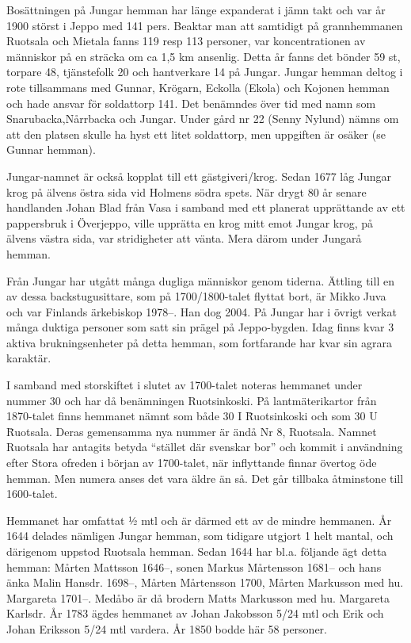 Bosättningen på Jungar hemman har länge expanderat i jämn takt och var år 1900 störst i Jeppo med 141 pers. Beaktar man att samtidigt på grannhemmanen Ruotsala och Mietala fanns 119 resp 113 personer, var koncentrationen av människor på en sträcka om ca 1,5 km ansenlig. Detta år fanns det bönder 59 st, torpare 48, tjänstefolk 20 och hantverkare 14 på Jungar. Jungar hemman deltog i rote tillsammans med Gunnar, Krögarn, Eckolla (Ekola) och Kojonen hemman och hade ansvar för soldattorp 141. Det benämndes över tid med namn som Snarubacka,Nårrbacka och Jungar. Under gård nr 22 (Senny Nylund) nämns om att den platsen skulle ha hyst ett litet soldattorp, men uppgiften är osäker (se Gunnar hemman).

Jungar-namnet är också kopplat till ett gästgiveri/krog. Sedan 1677 låg Jungar krog på älvens östra sida vid Holmens södra spets. När  drygt 80 år senare handlanden Johan Blad från Vasa i samband med ett planerat upprättande av ett pappersbruk i Överjeppo, ville upprätta en krog mitt emot Jungar krog,  på älvens västra sida, var stridigheter att vänta. Mera därom under Jungarå hemman.

Från Jungar har utgått många dugliga människor genom tiderna. Ättling till en av dessa backstugusittare, som på 1700/1800-talet flyttat bort, är Mikko Juva och var Finlands ärkebiskop 1978--. Han dog 2004. På Jungar har i övrigt verkat många duktiga personer som satt sin prägel på Jeppo-bygden. Idag finns kvar 3 aktiva brukningsenheter på detta hemman, som fortfarande har kvar sin agrara karaktär.



I samband med storskiftet i slutet av 1700-talet noteras hemmanet under nummer 30 och har då benämningen Ruotsinkoski. På lantmäterikartor från 1870-talet finns hemmanet nämnt som både 30 I \= Ruotsinkoski och som 30 U \= Ruotsala. Deras gemensamma nya nummer är ändå Nr 8, Ruotsala. Namnet Ruotsala har antagits betyda ``stället där svenskar bor'' och kommit i användning efter Stora ofreden i början av 1700-talet, när inflyttande finnar övertog öde hemman. Men numera anses det vara äldre än så. Det går tillbaka åtminstone till 1600-talet.

Hemmanet har omfattat ½ mtl och är därmed ett av de mindre hemmanen. År 1644 delades nämligen Jungar hemman, som tidigare utgjort 1 helt mantal, och därigenom uppstod Ruotsala hemman. Sedan 1644 har bl.a. följande ägt detta hemman:
Mårten Mattsson 1646--, sonen Markus Mårtensson 1681-- och hans änka Malin Hansdr. 1698--, Mårten Mårtensson  1700, Mårten Markusson med hu. Margareta 1701--. Medåbo är då brodern Matts Markusson med hu. Margareta Karlsdr. År 1783 ägdes hemmanet av Johan Jakobsson 5/24 mtl och Erik och Johan Eriksson 5/24 mtl vardera. År 1850 bodde här 58 personer.

